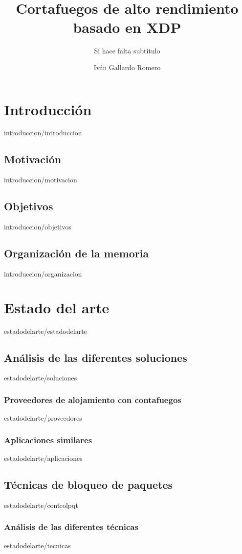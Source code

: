 \documentclass[epsbased,copyright,final,printable,covers,extendedindex,firstnumbered,tfg,gnuplot]{tfgtfmthesisuam}
\title{Cortafuegos de alto rendimiento basado en XDP}
\subtitle{Si hace falta subtítulo}
\author{Iván Gallardo Romero}
\begin{document}
\chapter{Introducción\label{CAP:INTRODUCCION}}{introduccion/introduccion}
 \section{Motivación\label{SEC:MOTIVACION}}{introduccion/motivacion}
 \section{Objetivos\label{SEC:OBJETIVOS}}{introduccion/objetivos}
 \section{Organización de la memoria\label{SEC:ORGANIZACION}}{introduccion/organizacion}
 
 
\chapter{Estado del arte\label{CAP:ESTADODELARTE}}{estadodelarte/estadodelarte}
    \section{Análisis de las diferentes soluciones\label{SEC:SOLUCIONES}}{estadodelarte/soluciones}
                \subsection{Proveedores de alojamiento con contafuegos\label{SEC:EAAS}}{estadodelarte/proveedores}
                \subsection{Aplicaciones similares\label{SEC:EAaplicacionesS}}{estadodelarte/aplicaciones}
    \section{Técnicas de bloqueo de paquetes\label{SEC:controlpqt}}{estadodelarte/controlpqt}
        \subsection{Análisis de las diferentes técnicas\label{SEC:NETFILTER}}{estadodelarte/tecnicas}
\end{document}
